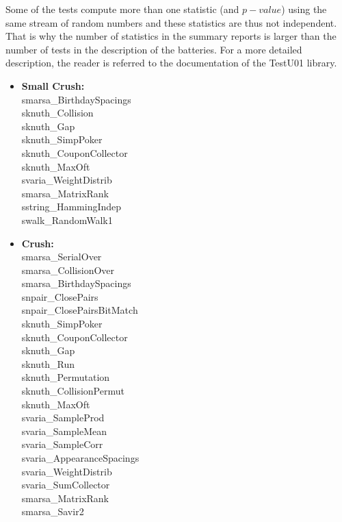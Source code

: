 Some of the tests compute more than one statistic (and $p-value$) using the same stream of random
numbers and these statistics are thus not independent. That is why the number of statistics
in the summary reports is larger than the number of tests in the description of the batteries.
For a more detailed description, the reader is referred
to the documentation of the TestU01 library.

\begin{itemize}
\item{\textbf{Small Crush:}}\\smarsa\_BirthdaySpacings \\ 
 sknuth\_Collision \\ 
 sknuth\_Gap\\ 
 sknuth\_SimpPoker \\ 
 sknuth\_CouponCollector\\ 
 sknuth\_MaxOft \\ 
 svaria\_WeightDistrib \\ 
 smarsa\_MatrixRank \\
 sstring\_HammingIndep\\ 
 swalk\_RandomWalk1\\ 
\item{\textbf{Crush:}}\\smarsa\_SerialOver \\
 smarsa\_CollisionOver\\ 
 smarsa\_BirthdaySpacings\\ 
 snpair\_ClosePairs\\ 
 snpair\_ClosePairsBitMatch \\
 sknuth\_SimpPoker\\ 
 sknuth\_CouponCollector\\ 
 sknuth\_Gap\\ 
 sknuth\_Run\\ 
 sknuth\_Permutation\\ 
 sknuth\_CollisionPermut\\ 
 sknuth\_MaxOft\\ 
 svaria\_SampleProd\\ 
 svaria\_SampleMean \\ 
 svaria\_SampleCorr\\ 
 svaria\_AppearanceSpacings \\
 svaria\_WeightDistrib \\
 svaria\_SumCollector\\ 
 smarsa\_MatrixRank\\ 
 smarsa\_Savir2\\ 

\end{itemize}

